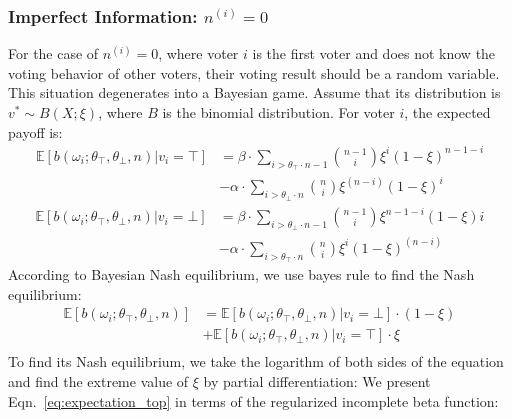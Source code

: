 \documentclass[11pt]{article}
\begin{document}
\subsubsection{Imperfect Information: $n^{(i)}=0$}
\label{sec:imperfect_information}
For the case of $n^{(i)}=0$, where voter $i$ is the first voter and does not know the voting behavior of other voters, their voting result should be a random variable. This situation degenerates into a Bayesian game.
Assume that its distribution is $v^*\sim B(X;\xi)$, where $B$ is the binomial distribution. For voter $i$, the expected payoff is:
\begin{equation}
  \label{eq:expectation_top}
  \begin{aligned}
    \mathbb{E}[b(\omega_i;\theta_\top,\theta_\bot,n )| v_i=\top] &= \beta\cdot\sum_{i>\theta_\top\cdot n-1}{\binom{n-1}{i}\xi^i(1-\xi)^{n-1-i}} \\
    &- \alpha\cdot\sum_{i>\theta_\bot\cdot n}{\binom{n}{i}\xi^{(n-i)}(1-\xi)^{i}}
  \end{aligned}
\end{equation}
\begin{equation}
  \label{eq:expectation_bot}
  \begin{aligned}
    \mathbb{E}[b(\omega_i;\theta_\top,\theta_\bot,n )| v_i=\bot] &= \beta\cdot\sum_{i>\theta_\bot\cdot n-1}{\binom{n-1}{i}\xi^{n-1-i}(1-\xi)i}\\
     &- \alpha\cdot\sum_{i>\theta_\top\cdot n}{\binom{n}{i}\xi^{i}(1-\xi)^{(n-i)}}
  \end{aligned}
\end{equation}
According to Bayesian Nash equilibrium, we use bayes rule to find the Nash equilibrium:
\begin{equation}
  \label{eq:expectation_topl}
  \begin{aligned}
    \mathbb{E}[b(\omega_i;\theta_\top,\theta_\bot,n)] &=   \mathbb{E}[b(\omega_i;\theta_\top,\theta_\bot,n )| v_i=\bot]\cdot (1-\xi)\\
    &+ \mathbb{E}[b(\omega_i;\theta_\top,\theta_\bot,n )| v_i=\top]\cdot \xi\\
  \end{aligned}
\end{equation}
To find its Nash equilibrium, we take the logarithm of both sides of the equation and find the extreme value of $\xi$ by partial differentiation: We present Eqn.~\ref{eq:expectation_top} in terms of the regularized incomplete beta function:
\end{document}

